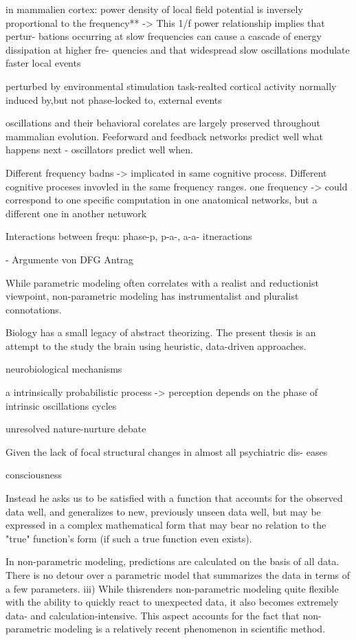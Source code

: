 \documentclass[authoryear,review,3p]{elsarticle}
\begin{document}
in mammalien cortex: power density of local field potential is inversely proportional to the frequency** -> This 1/f power relationship implies that pertur- bations occurring at slow frequencies can cause a cascade of energy dissipation at higher fre- quencies and that widespread slow oscillations modulate faster local events

perturbed by environmental stimulation
task-realted cortical activity normally induced by,but not phase-locked
to, external events

oscillations and their behavioral corelates are largely preserved
throughout mammalian evolution.
Feeforward and feedback networks predict well what happens next -
oscillators predict well when.

Different frequency badns -> implicated in same cognitive process.
Different cognitive proceses invovled in the same frequency ranges.
one frequency -> could correspond to one specific computation in
one anatomical networks, but a different one in another netuwork

Interactions between frequ: phase-p, p-a-, a-a- itneractions






- Argumente von DFG Antrag

While parametric modeling often correlates with a realist and reductionist viewpoint, non-parametric modeling has instrumentalist and pluralist connotations.

Biology has a small legacy of abstract theorizing.
The present thesis is an attempt to the study the brain using
heuristic, data-driven approaches.

neurobiological mechanisms


a intrinsically probabilistic process
-> perception depends on the phase of intrinsic oscillations cycles

unresolved nature-nurture debate

Given the lack of focal structural changes in almost all psychiatric dis- eases

consciousness

Instead he asks us to be satisfied with a function that
accounts for the observed data well, and generalizes to new,
previously unseen data well, but may be expressed in a complex mathematical
form that may bear no relation to the "true" function's form
(if such a true function even exists).


In non-parametric modeling, predictions are calculated on the basis of all data. There is no detour over a parametric model that summarizes the data in terms of a few parameters. iii) While thisrenders non-parametric modeling quite flexible with the ability to quickly react to unexpected data, it also becomes extremely data- and calculation-intensive. This aspect accounts for the fact that non-parametric modeling is a relatively recent phenomenon in scientific method.
\end{document}
